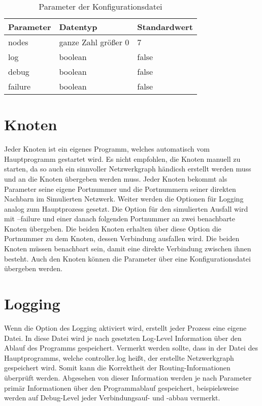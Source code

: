 \begin{table}
\caption{Parameter der Konfigurationsdatei}
\label{main_params_file}
\centering
\begin{tabular}{ | m{3cm} | m{3cm} | m{3cm}| }
\hline
\textbf{Parameter} & \textbf{Datentyp} & \textbf{Standardwert} \\
\hline
nodes & ganze Zahl größer 0 & 7 \\
\hline
log & boolean & false \\
\hline
debug & boolean & false \\
\hline
failure & boolean & false \\
\hline
\end{tabular}
\end{table}

\section{Knoten}
Jeder Knoten ist ein eigenes Programm, welches automatisch vom Hauptprogramm gestartet wird. Es nicht empfohlen, die Knoten manuell zu starten, da so auch ein sinnvoller Netzwerkgraph händicsh erstellt werden muss und an die Knoten übergeben werden muss. Jeder Knoten bekommt als Parameter seine eigene Portnummer und die Portnummern seiner direkten Nachbarn im Simulierten Netzwerk. Weiter werden die Optionen für Logging analog zum Hauptprozess gesetzt. Die Option für den simulierten Ausfall wird mit --failure und einer danach folgenden Portnummer an zwei benachbarte Knoten übergeben. Die beiden Knoten erhalten über diese Option die Portnummer zu dem Knoten, dessen Verbindung ausfallen wird. Die beiden Knoten müssen benachbart sein, damit eine direkte Verbindung zwischen ihnen besteht. Auch den Knoten können die Parameter über eine Konfigurationsdatei übergeben werden.

\section{Logging}
Wenn die Option des Logging aktiviert wird, erstellt jeder Prozess eine eigene Datei. In diese Datei wird je nach gesetzten Log-Level Information über den Ablauf des Programms gespeichert. Vermerkt werden sollte, dass in der Datei des Hauptprogramms, welche controller.log heißt, der erstellte Netzwerkgraph gespeichert wird. Somit kann die Korrektheit der Routing-Informationen überprüft werden. Abgesehen von dieser Information werden je nach Parameter primär Informationen über den Programmablauf gespeichert, beispielsweise werden auf Debug-Level jeder Verbindungsauf- und -abbau vermerkt.